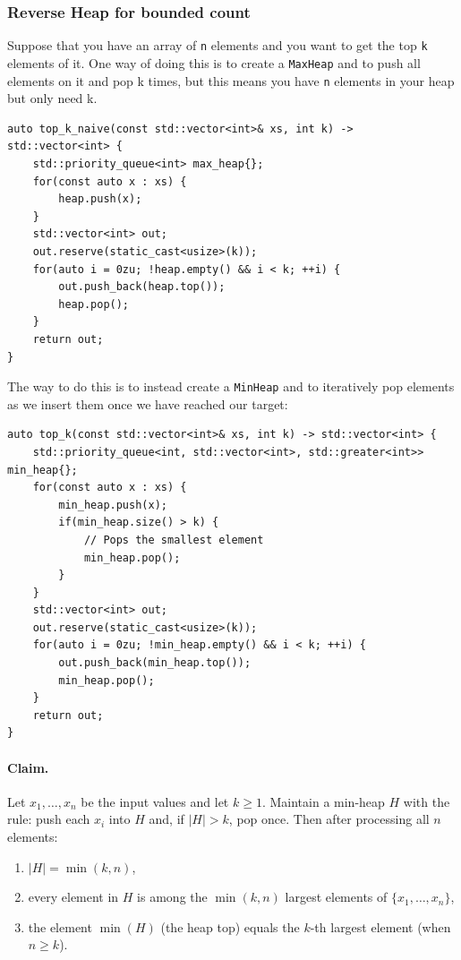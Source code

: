 \documentclass{article}
\begin{document}
\subsubsection{Reverse Heap for bounded count}
Suppose that you have an array of \texttt{n} elements and you want to get the top \texttt{k} elements of it. One way of doing this is to create a \texttt{MaxHeap} and to push all elements on it and pop k times, but this means you have \texttt{n} elements in your heap but only need k. 
\begin{lstlisting}
auto top_k_naive(const std::vector<int>& xs, int k) -> std::vector<int> {
    std::priority_queue<int> max_heap{};
    for(const auto x : xs) {
        heap.push(x);
    }
    std::vector<int> out;
    out.reserve(static_cast<usize>(k));
    for(auto i = 0zu; !heap.empty() && i < k; ++i) {
        out.push_back(heap.top());
        heap.pop();
    }
    return out;
}
\end{lstlisting}
The way to do this is to instead create a \texttt{MinHeap} and to iteratively pop elements as we insert them once we have reached our target:
\begin{lstlisting}
auto top_k(const std::vector<int>& xs, int k) -> std::vector<int> {
    std::priority_queue<int, std::vector<int>, std::greater<int>> min_heap{};
    for(const auto x : xs) {
        min_heap.push(x);
        if(min_heap.size() > k) {
            // Pops the smallest element
            min_heap.pop();
        }
    }
    std::vector<int> out;
    out.reserve(static_cast<usize>(k));
    for(auto i = 0zu; !min_heap.empty() && i < k; ++i) {
        out.push_back(min_heap.top());
        min_heap.pop();
    }
    return out;
}
\end{lstlisting}

\paragraph{Claim.}
Let $x_1,\dots,x_n$ be the input values and let $k \ge 1$.
Maintain a min-heap $H$ with the rule: push each $x_i$ into $H$ and, if $|H|>k$, pop once.
Then after processing all $n$ elements:

\begin{enumerate}
\item $|H|=\min(k,n)$,
\item every element in $H$ is among the $\min(k,n)$ largest elements of $\{x_1,\dots,x_n\}$,
\item the element $\min(H)$ (the heap top) equals the $k$-th largest element (when $n \ge k$).
\end{enumerate}
\end{document}
